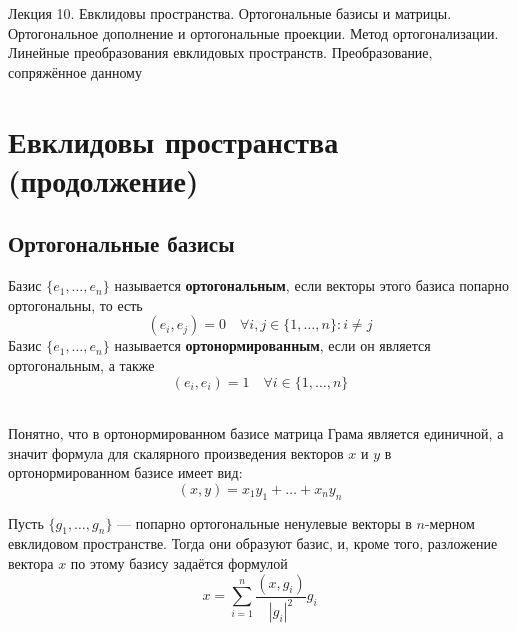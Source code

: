 \documentclass[11pt]{article}
\begin{document}
\begin{titlepage}
    \centering
    \vspace*{\fill}  %

    {\Huge Лекция 10. Евклидовы пространства. Ортогональные базисы и матрицы. Ортогональное дополнение и ортогональные проекции. Метод ортогонализации. Линейные преобразования евклидовых пространств. Преобразование, сопряжённое данному
    \par}

    \vspace*{\fill}  %
\end{titlepage}

\setcounter{page}{1}

\section{Евклидовы пространства (продолжение)}

\subsection{Ортогональные базисы}

\begin{definition}
    Базис $\{e_1, \ldots, e_n\}$ называется \textbf{ортогональным}, если векторы этого базиса попарно ортогональны, то есть 
    \[(e_i, e_j) = 0 \quad \forall i, j \in \{1, \ldots, n\} : i \neq j\]
    Базис $\{e_1, \ldots, e_n\}$ называется \textbf{ортонормированным}, если он является ортогональным, а также
    \[(e_i, e_i) = 1 \quad \forall i \in \{1, \ldots, n\}\]
\end{definition} \leavevmode
\\
Понятно, что в ортонормированном базисе матрица Грама является единичной, а значит формула для скалярного произведения векторов $x$ и $y$ в ортонормированном базисе имеет вид:
\[(x, y) = x_1 y_1 + \ldots + x_n y_n\]

\begin{theorem}
    Пусть $\{g_1, \ldots, g_n\}$ --- попарно ортогональные ненулевые векторы в $n$-мерном евклидовом пространстве. Тогда они образуют базис, и, кроме того, разложение вектора $x$ по этому базису задаётся формулой
    \begin{equation} \label{eq:1.1}
        x = \sum_{i = 1}^n \frac{(x, g_i)}{\left\lvert g_i \right\rvert^2} g_i
    \end{equation}
\end{theorem}
\end{document}
